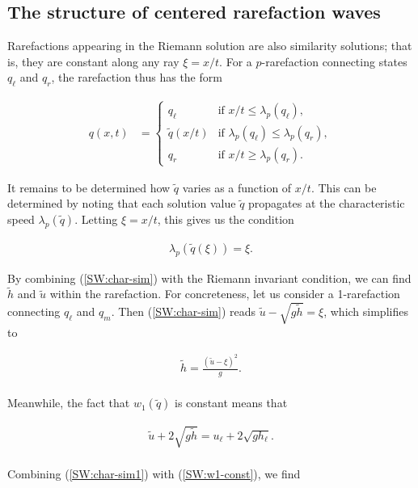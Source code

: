 \documentclass{SIAMbook2016}
\begin{document}
\hypertarget{the-structure-of-centered-rarefaction-waves}{%
\subsection{The structure of centered rarefaction
waves}\label{the-structure-of-centered-rarefaction-waves}}

Rarefactions appearing in the Riemann solution are also similarity
solutions; that is, they are constant along any ray \(\xi=x/t\). For a
\(p\)-rarefaction connecting states \(q_\ell\) and \(q_r\), the
rarefaction thus has the form

\begin{align}
    q(x,t) & = \begin{cases} q_\ell & \text{if } x/t \le \lambda_p(q_\ell), \\
                            \tilde{q}(x/t) & \text{if } \lambda_p(q_\ell) \le \lambda_p(q_r), \\
                            q_r & \text{if } x/t \ge \lambda_p(q_r). \end{cases}
\end{align}

It remains to be determined how \(\tilde{q}\) varies as a function of
\(x/t\). This can be determined by noting that each solution value
\(\tilde{q}\) propagates at the characteristic speed
\(\lambda_p(\tilde{q})\). Letting \(\xi=x/t\), this gives us the
condition

\begin{align} \label{SW:char-sim}
    \lambda_p(\tilde{q}(\xi)) = \xi.
\end{align}

By combining (\ref{SW:char-sim}) with the Riemann invariant condition,
we can find \(\tilde{h}\) and \(\tilde{u}\) within the rarefaction. For
concreteness, let us consider a 1-rarefaction connecting \(q_\ell\) and
\(q_m\). Then (\ref{SW:char-sim}) reads
\(\tilde{u} - \sqrt{g\tilde{h}} = \xi\), which simplifies to

\begin{align} \label{SW:char-sim1}
\tilde{h} = \frac{(\tilde{u}-\xi)^2}{g}.
\end{align}\\
Meanwhile, the fact that \(w_1(\tilde{q})\) is constant means that

\begin{align} \label{SW:w1-const}
    \tilde{u} + 2 \sqrt{g\tilde{h}} = u_\ell + 2 \sqrt{gh_\ell}.
\end{align}\\
Combining (\ref{SW:char-sim1}) with (\ref{SW:w1-const}), we find
\end{document}
